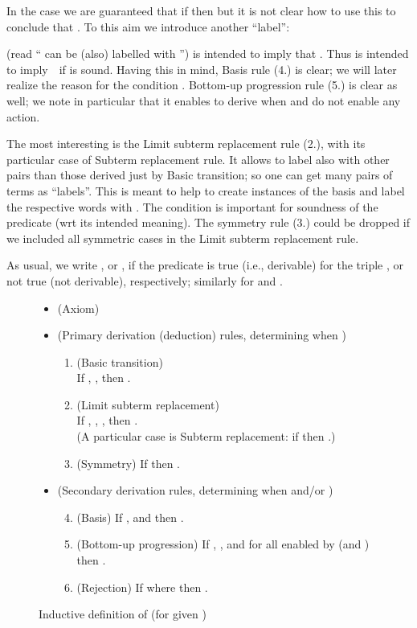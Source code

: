 \documentclass[12pt]{article}
\begin{document}
In the case    we are guaranteed that 
if  then  but it is not clear
how to use this to conclude that .
To this aim we introduce another ``label'': 
 
(read `` can be (also) labelled with '')
is intended
to imply
that 
. Thus  
is intended to imply
\,\, if  is sound.
Having this in mind, Basis rule (4.) is clear;
 we will later
realize the reason for the condition .
Bottom-up progression rule (5.) is clear as well;
we note in particular that it enables 
to derive
 when  and
 do not enable any action. 

The most interesting is the 
Limit subterm replacement rule (2.),
with its particular case of Subterm replacement rule.
It allows to label  also with other pairs than those derived just
by Basic transition; so one  can get many pairs of terms as
``labels''.
This is meant to help
to create instances of the
basis and label the respective words with .
The condition  is important for soundness of 
the predicate  (wrt its intended meaning).
The symmetry rule 
(3.) could be dropped if we included 
all symmetric cases in the Limit subterm replacement rule.

As usual, we write 
, or ,
if the predicate is true (i.e., derivable) for the triple
, or not true (not derivable), 
respectively; similarly for  and .

\begin{figure}[t]
\begin{itemize}
\item
(Axiom) 
\item
(Primary derivation (deduction) rules, determining when )
\begin{enumerate}
\item (Basic transition) 
\\
If ,  , 
then .
\item (Limit subterm replacement) 
\\
If  , ,
  ,  
then .
\\
(A particular case is Subterm replacement:
if  then .)

\item (Symmetry)
If   then  .
\end{enumerate}
\item
(Secondary derivation rules, determining when  and/or
 )
\begin{enumerate}
\setcounter{enumi}{3}
\item (Basis)
If , 
 and  then 
.
\item
(Bottom-up progression)
If , ,
and 
for all  enabled by  (and )
then
.
\item (Rejection)
If    where  then 
.
\end{enumerate}
\end{itemize}
\caption{Inductive definition of 
(for given )
}\label{fig:dersystem1}
\end{figure}
\end{document}
